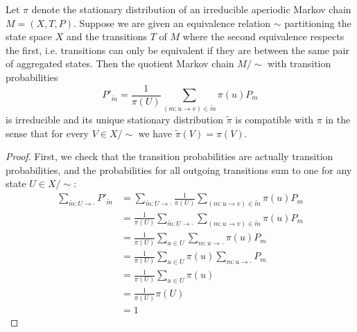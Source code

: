 \documentclass[10pt,a4paper]{amsart}
\begin{document}
\begin{theorem}
    Let $\pi$ denote the stationary distribution of an irreducible aperiodic Markov chain $M=(X,T,P)$. Suppose we are given an equivalence relation $\sim$ partitioning the state space $X$ and the transitions $T$ of $M$ where the second equivalence respects the first, i.e. transitions can only be equivalent if they are between the same pair of aggregated states. Then the quotient Markov chain $M/\sim$ with transition probabilities
    \[P'_{\widetilde{m}} = \frac{1}{\pi(U)} \sum_{(m:u\to v)\in\widetilde{m}}\pi(u)P_m\]
    is irreducible and its unique stationary distribution $\widetilde\pi$ is compatible with $\pi$ in the sense that for every $V\in X/\sim$ we have $\widetilde\pi(V)=\pi(V)$.
\end{theorem}

\begin{proof}
    First, we check that the transition probabilities are actually transition probabilities, and the probabilities for all outgoing transitions sum to one for any state $U\in X/\sim$:
    \begin{align*}
    \sum_{\widetilde{m}: U\to \cdot} P'_{\widetilde{m}} 
        &= \sum_{\widetilde{m}: U\to \cdot} \frac{1}{\pi(U)} \sum_{(m:u\to v)\in\widetilde{m}}\pi(u) P_m \\
        &= \frac{1}{\pi(U)} \sum_{\widetilde{m}: U\to \cdot} \sum_{(m:u\to v)\in\widetilde{m}}\pi(u) P_m \\
        &= \frac{1}{\pi(U)} \sum_{u\in U} \sum_{m: u\to \cdot}\pi(u) P_m \\
        &= \frac{1}{\pi(U)} \sum_{u\in U} \pi(u) \sum_{m: u\to \cdot } P_m \\
        &= \frac{1}{\pi(U)} \sum_{u\in U} \pi(u) \\
        &= \frac{1}{\pi(U)} \pi(U)  \\
        &= 1
    \end{align*}


\end{proof}
\end{document}
